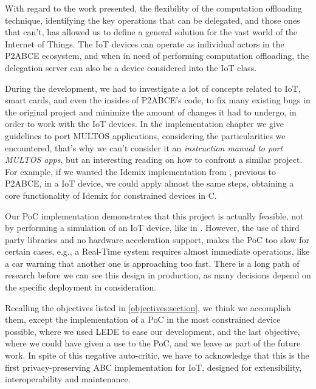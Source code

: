 \documentclass[journal]{IEEEtran}
\begin{document}
With regard to the work presented, the flexibility of the computation offloading technique, identifying the key operations that can be delegated, and those ones that can't, has allowed us to define a general solution for the vast world of the Internet of Things. The IoT devices can operate as individual actors in the P2ABCE ecosystem, and when in need of performing computation offloading, the delegation server can also be a device considered into the IoT class.




During the development, we had to investigate a lot of concepts related to IoT, smart cards, and even the insides of P2ABCE's code, to fix many existing bugs in the original project and minimize the amount of changes it had to undergo, in order to work with the IoT devices. In the implementation chapter we give guidelines to port MULTOS applications, considering the particularities we encountered, that's why we can't consider it an \textit{instruction manual to port MULTOS apps}, but an interesting reading on how to confront a similar project. For example, if we wanted the Idemix implementation from \citep{vullers2013efficient}, previous to P2ABCE, in a IoT device, we could apply almost the same steps, obtaining a core functionality of Idemix for constrained devices in C.

Our PoC implementation demonstrates that this project is actually feasible, not by performing a simulation of an IoT device, like in \citep{vanet}. However, the use of third party libraries and no hardware acceleration support, makes the PoC too slow for certain cases, e.g., a Real-Time system requires almost immediate operations, like a car warning that another one is approaching too fast.
There is a long path of research before we can see this design in production, as many decisions depend on the specific deployment in consideration.


Recalling the objectives listed in \autoref{objectives:section}, we think we accomplish them, except the implementation of a PoC in the most constrained device possible, where we used LEDE to ease our development, and the last objective, where we could have given a use to the PoC, and we leave as part of the future work. In spite of this negative auto-critic, we have to acknowledge that this is the first privacy-preserving ABC implementation for IoT, designed for extensibility, interoperability and maintenance.
\end{document}
